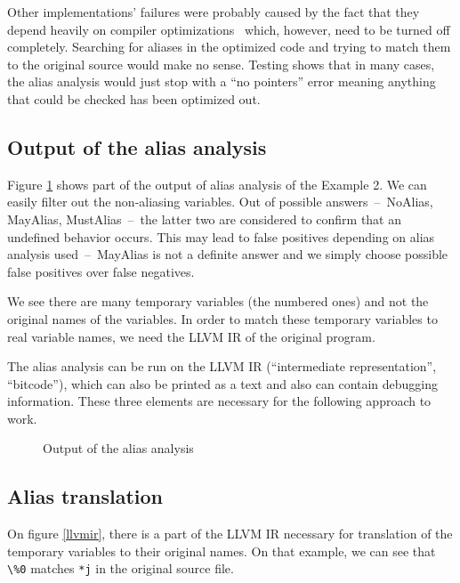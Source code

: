 Other implementations' failures were probably caused by the fact that they depend heavily on compiler optimizations~\cite{alias-analysis-optimizations} which, however, need to be turned off completely. Searching for aliases in the optimized code and trying to match them to the original source would make no sense. Testing shows that in many cases, the alias analysis would just stop with a ``no pointers'' error meaning anything that could be checked has been optimized out.

\subsection{Output of the alias analysis}
Figure \ref{alias-output} shows part of the output of alias analysis of the Example 2. We can easily filter out the non-aliasing variables. Out of possible answers~--~NoAlias, MayAlias, MustAlias~--~the latter two are considered to confirm that an undefined behavior occurs. This may lead to false positives depending on alias analysis used~--~MayAlias is not a definite answer and we simply choose possible false positives over false negatives.

We see there are many temporary variables (the numbered ones) and not the original names of the variables. In order to match these temporary variables to real variable names, we need the LLVM IR of the original program.

The alias analysis can be run on the LLVM IR (``intermediate representation'', ``bitcode''), which can also be printed as a text and also can contain debugging information. These three elements are necessary for the following approach to work.
\begin{figure}
\caption{Output of the alias analysis}
\label{alias-output}
\end{figure}

\subsection{Alias translation}
On figure \ref{llvmir}, there is a part of the LLVM IR necessary for translation of the temporary variables to their original names. On that example, we can see that \verb|\%0| matches \verb|*j| in the original source file.

